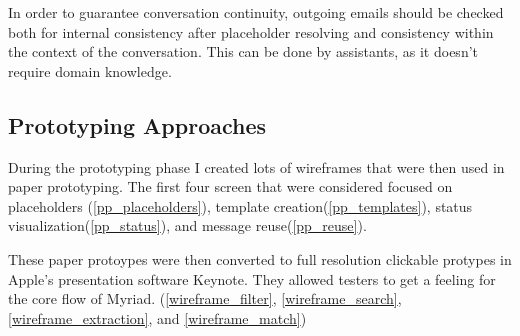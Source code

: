 In order to guarantee conversation continuity, outgoing emails should be checked both for internal consistency after placeholder resolving and consistency within the context of the conversation. This can be done by assistants, as it doesn’t require domain knowledge.

\subsection{Prototyping Approaches}

During the prototyping phase I created lots of wireframes that were then used in paper prototyping.
The first four screen that were considered focused on placeholders (\autoref{pp_placeholders}), template creation(\autoref{pp_templates}), status visualization(\autoref{pp_status}), and message reuse(\autoref{pp_reuse}).






These paper protoypes were then converted to full resolution clickable protypes in Apple's presentation software Keynote. They allowed testers to get a feeling for the core flow of Myriad. (\autoref{wireframe_filter}, \autoref{wireframe_search}, \autoref{wireframe_extraction}, and \autoref{wireframe_match})







